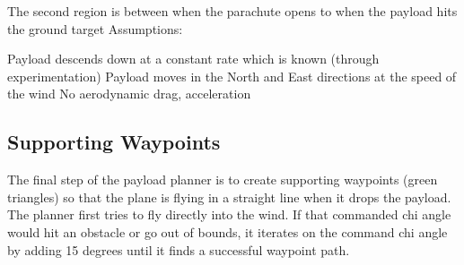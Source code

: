 \documentclass[]{auvsi_doc}
\begin{document}
The second region is between when the parachute opens to when the payload hits the ground target Assumptions:

    Payload descends down at a constant rate which is known (through experimentation)
    Payload moves in the North and East directions at the speed of the wind
    No aerodynamic drag, acceleration

\subsection{Supporting Waypoints}

The final step of the payload planner is to create supporting waypoints (green triangles) so that the plane is flying in a straight line when it drops the payload.
The planner first tries to fly directly into the wind. If that commanded chi angle would hit an obstacle or go out of bounds, it iterates on the command chi angle by adding 15 degrees until it finds a successful waypoint path.
\end{document}
